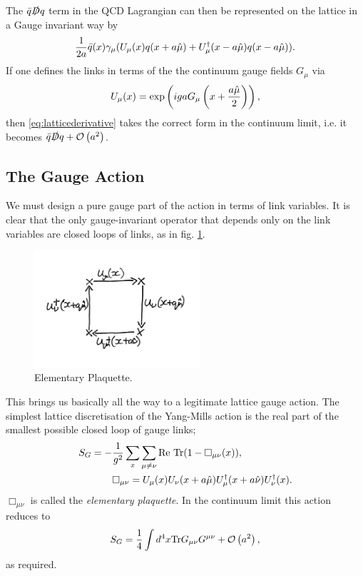 The $\bar{q}\slashed{D}q$ term in the QCD Lagrangian can then be represented on the lattice in a Gauge invariant way by
\begin{align}
  {1\over 2a}\bar{q}(x) \gamma_{\mu}(U_{\mu}(x)q(x+a\hat{\mu}) + U^{\dagger}_{\mu}(x-a\hat{\mu})q(x-a\hat{\mu}) ).
  \label{eq:latticederivative}
\end{align}
If one defines the links in terms of the the continuum gauge fields $G_{\mu}$ via
\begin{align}
  U_{\mu}(x) = \exp\left( iga G_{\mu}\left(x+{a\hat{\mu}\over2}\right) \right),
\end{align}
then \eqref{eq:latticederivative} takes the correct form in the continuum limit, i.e. it becomes $\bar{q}\slashed{D}q + \mathcal{O}\left( a^2 \right)$.

\subsection{The Gauge Action}

We must design a pure gauge part of the action in terms of link variables. It is clear that the only gauge-invariant operator that depends only on the link variables are closed loops of links, as in fig. \ref{fig:plaquette}.

\begin{figure}[htb!]
  \begin{center}
    \vspace{-10pt}
    \includegraphics[width=0.55\textwidth]{images/plaquette.jpg}
    \vspace{-15pt}
    \caption{Elementary Plaquette. \label{fig:plaquette}}
  \end{center}
\end{figure}

This brings us basically all the way to a legitimate lattice gauge action. The simplest lattice discretisation of the Yang-Mills action is the real part of the smallest possible closed loop of gauge links;
\begin{align}
  S_G = - &{1\over g^2} \sum_x \sum_{\mu\neq \nu} \text{Re Tr} (1-\Box_{\mu\nu}(x)), \\
  &\Box_{\mu\nu} = U_{\mu}(x)U_{\nu}(x+a\hat{\mu}) U^{\dagger}_{\mu}(x+a\hat{\nu}) U^{\dagger}_{\nu}(x).
  \label{eq:wilson_gauge_action}
\end{align}
$\Box_{\mu\nu}$ is called the {\it{elementary plaquette}}. In the continuum limit this action reduces to
\begin{align}
  S_G = {1\over 4} \int d^4x \text{Tr}G_{\mu\nu}G^{\mu\nu} + \mathcal{O}\left( a^2 \right),
\end{align}
as required.

